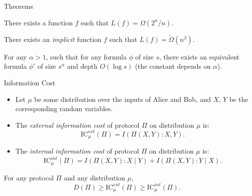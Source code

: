 \documentclass[
aspectratio=169]{beamer}
\newcommand{\pitem}{\pause\item}
\newcommand{\IC}{\mathrm{IC}}
\begin{document}
\begin{frame}{Theorems}
   \begin{theorem}[Shannon]
       There exists a function $f$ such that $L(f) = \Omega(2^n/n)$.
   \end{theorem}

   \pause
   \begin{theorem}[Håstad]
        There exists an \emph{implicit} function $f$ such that $L(f) = \tilde\Omega(n^3)$.
   \end{theorem}

   \pause
   \begin{theorem}
        For any $\alpha > 1$, such that for any formula $\phi$ of size $s$, there exists an equivalent formula $\phi'$ of size $s^\alpha$ and depth $O(\log s)$ (the constant depends on $\alpha$).
   \end{theorem}
\end{frame}

\begin{frame}{Information Cost}

    \begin{itemize}
        \item
            Let $\mu$ be some distribution over the inputs of Alice and Bob,
            and $X$, $Y$ be the corresponding random variables.

        \pitem The \emph{external information cost} of protocol $\Pi$ on distribution $\mu$ is:
            $$\IC_\mu^{ext}(\Pi) = I(\Pi(X,Y) : X, Y).$$


        \pitem The \emph{internal information cost} of protocol $\Pi$ on distribution $\mu$ is:
            $$\IC_\mu^{int}(\Pi) = I(\Pi(X,Y) : X \mid Y) + I(\Pi(X,Y) : Y \mid X).$$
    \end{itemize}

    \pause
    \begin{lemma}
        For any protocol $\Pi$ and any distribution $\mu$,
        \[
        D(\Pi) \ge \IC_\mu^{ext}(\Pi) \ge \IC_\mu^{int}(\Pi).
        \]
    \end{lemma}

\end{frame}
\end{document}
